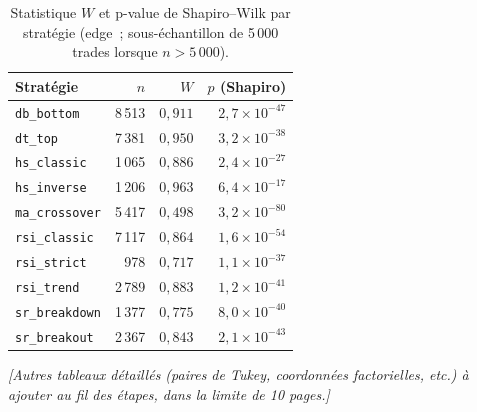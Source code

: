 \begin{table}[H]
\centering
\caption{Statistique \(W\) et p-value de Shapiro--Wilk par stratégie
(edge~; sous-échantillon de 5\,000 trades lorsque \(n > 5\,000\)).}
\label{tab:ann-shapiro}
\small
\begin{tabular}{@{}lrrr@{}}
\toprule
Stratégie & $n$ & $W$ & $p$ (Shapiro) \\
\midrule
\texttt{db\_bottom}    & 8\,513 & $0{,}911$ & $2{,}7\times10^{-47}$ \\
\texttt{dt\_top}       & 7\,381 & $0{,}950$ & $3{,}2\times10^{-38}$ \\
\texttt{hs\_classic}   & 1\,065 & $0{,}886$ & $2{,}4\times10^{-27}$ \\
\texttt{hs\_inverse}   & 1\,206 & $0{,}963$ & $6{,}4\times10^{-17}$ \\
\texttt{ma\_crossover} & 5\,417 & $0{,}498$ & $3{,}2\times10^{-80}$ \\
\texttt{rsi\_classic}  & 7\,117 & $0{,}864$ & $1{,}6\times10^{-54}$ \\
\texttt{rsi\_strict}   &   978  & $0{,}717$ & $1{,}1\times10^{-37}$ \\
\texttt{rsi\_trend}    & 2\,789 & $0{,}883$ & $1{,}2\times10^{-41}$ \\
\texttt{sr\_breakdown} & 1\,377 & $0{,}775$ & $8{,}0\times10^{-40}$ \\
\texttt{sr\_breakout}  & 2\,367 & $0{,}843$ & $2{,}1\times10^{-43}$ \\
\bottomrule
\end{tabular}
\end{table}

\emph{[Autres tableaux détaillés (paires de Tukey, coordonnées
factorielles, etc.) à ajouter au fil des étapes, dans la limite de 10
pages.]}
